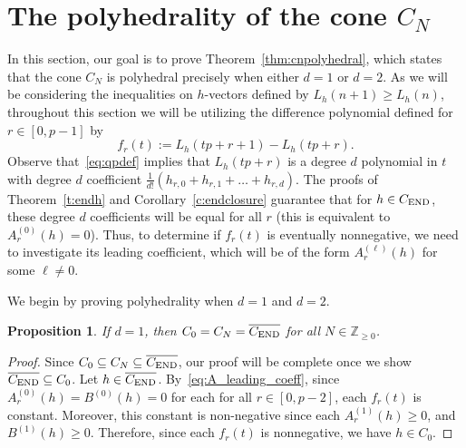 \documentclass[12pt]{amsart}
\newtheorem{prop}[thm]{Proposition}
\theoremstyle{definition}
\numberwithin{equation}{section}
\renewcommand\>{\rangle}
\newcommand\<{\langle}
\newcommand\0{\mathbf{0}}
\newcommand\ZZ{\mathbb{Z}}
\newcommand{\CEND}{C_\textnormal{END}}
\begin{document}
\section{The polyhedrality of the cone $C_N$}%
\label{sec:generalpolyhedrality}%

In this section, our goal is to prove Theorem~\ref{thm:cnpolyhedral}, which states that the cone $C_N$ is polyhedral precisely when either $d=1$ or $d=2$.
As we will be considering the inequalities on $h$-vectors defined by $L_h(n+1)\geq L_h(n)$, throughout this section we will be utilizing the difference polynomial defined for $r \in [0,p-1]$ by 
\[
f_r(t) := L_h(tp+r+1) - L_h(tp+r).
\]
Observe that~\eqref{eq:qpdef} implies that $L_h(tp + r)$ is a degree $d$ polynomial in $t$ with degree $d$ coefficient $\tfrac{1}{d!} (h_{r,0} + h_{r,1} + \dots + h_{r,d})$. 
The proofs of Theorem~\ref{t:endh} and Corollary~\ref{c:endclosure} guarantee that for $h\in \CEND$, these degree $d$ coefficients will be equal for all $r$ (this is equivalent to $A^{(0)}_r(h) = 0$).
Thus, to determine if $f_r(t)$ is eventually nonnegative, we need to investigate its leading coefficient, which will be of the form $A^{(\ell)}_r(h)$ for some $\ell \neq 0$. 

We begin by proving polyhedrality when $d=1$ and $d=2$.
	 
\begin{prop}\label{prop:d1polyhedral}
	If $d=1$, then $C_0 = C_N = \overline{\CEND}$ for all $N \in \ZZ_{\geq 0}$.
\end{prop}
\begin{proof}
	Since $C_0 \subseteq C_N \subseteq \overline{\CEND}$, our proof will be complete once we show $\overline{\CEND} \subseteq C_0$.
	Let $h \in \overline{\CEND}$. 
	By~\eqref{eq:A_leading_coeff}, since $A_r^{(0)}(h) = B^{(0)}(h) = 0$ for each  for all $r \in [0,p-2]$, each $f_r(t)$ is constant.  Moreover, this constant is non-negative since each $A_r^{(1)}(h) \geq 0$, and $B^{(1)}(h) \geq 0$.  
	 Therefore, since each $f_r(t)$ is nonnegative, we have $h \in C_0$.
\end{proof}
\end{document}
